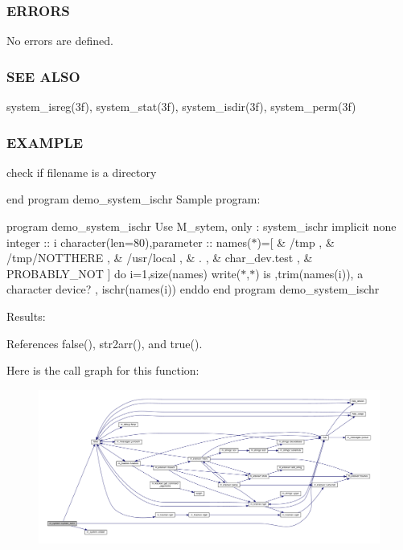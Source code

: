 \subsubsection*{E\+R\+R\+O\+RS}

No errors are defined.

\subsubsection*{S\+EE A\+L\+SO}

system\+\_\+isreg(3f), system\+\_\+stat(3f), system\+\_\+isdir(3f), system\+\_\+perm(3f)

\subsubsection*{E\+X\+A\+M\+P\+LE}

check if filename is a directory

end program demo\+\_\+system\+\_\+ischr Sample program\+:

program demo\+\_\+system\+\_\+ischr Use M\+\_\+sytem, only \+: system\+\_\+ischr implicit none integer \+:\+: i character(len=80),parameter \+:\+: names($\ast$)=\mbox{[} \& \textquotesingle{}/tmp \textquotesingle{}, \& \textquotesingle{}/tmp/\+N\+O\+T\+T\+H\+E\+RE \textquotesingle{}, \& \textquotesingle{}/usr/local \textquotesingle{}, \& \textquotesingle{}. \textquotesingle{}, \& \textquotesingle{}char\+\_\+dev.\+test \textquotesingle{}, \& \textquotesingle{}P\+R\+O\+B\+A\+B\+L\+Y\+\_\+\+N\+OT \textquotesingle{}\mbox{]} do i=1,size(names) write($\ast$,$\ast$)\textquotesingle{} is \textquotesingle{},trim(names(i)),\textquotesingle{} a character device? \textquotesingle{}, ischr(names(i)) enddo end program demo\+\_\+system\+\_\+ischr

Results\+: 

References false(), str2arr(), and true().

Here is the call graph for this function\+:
\nopagebreak
\begin{figure}[H]
\begin{center}
\leavevmode
\includegraphics[width=350pt]{namespacem__system_a12a948fa4aacda084a538ae3a5ae3cc6_cgraph}
\end{center}
\end{figure}
\mbox{\label{namespacem__system_ad097988a031e64b4f21f856cf45c9c73}} 
